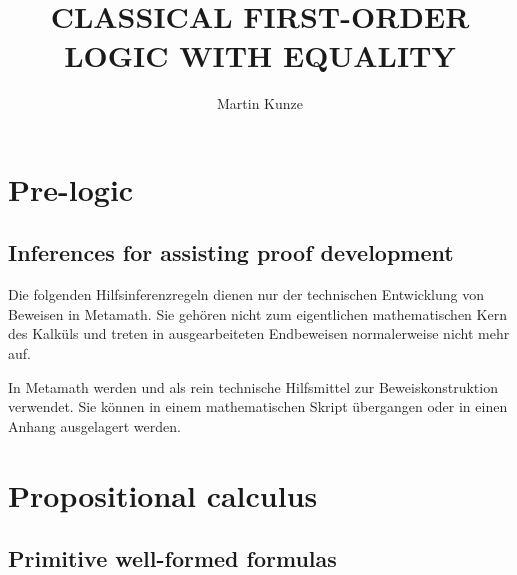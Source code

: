 \documentclass[main.tex]{subfiles}
\title{CLASSICAL FIRST-ORDER LOGIC WITH EQUALITY}
\author{Martin Kunze}
\date{}
\begin{document}
\maketitle
\tableofcontents
\setcounter{file}{2}
\renewcommand{\FormulaBandID}{2}


\chapter{Pre-logic}

\section{Inferences for assisting proof development}

\begin{remark}
Die folgenden Hilfsinferenzregeln dienen nur der technischen Entwicklung von Beweisen in
Metamath. Sie gehören nicht zum eigentlichen mathematischen Kern des Kalküls und treten
in ausgearbeiteten Endbeweisen normalerweise nicht mehr auf.
\end{remark}

\begin{tabproof}
\end{tabproof}

\begin{tabproof}
\end{tabproof}

\begin{hint}
In Metamath werden  und  als rein technische
Hilfsmittel zur Beweiskonstruktion verwendet. Sie können in einem mathematischen Skript
übergangen oder in einen Anhang ausgelagert werden.
\end{hint}

\chapter{Propositional calculus}

\section{Primitive well-formed formulas}
\end{document}
